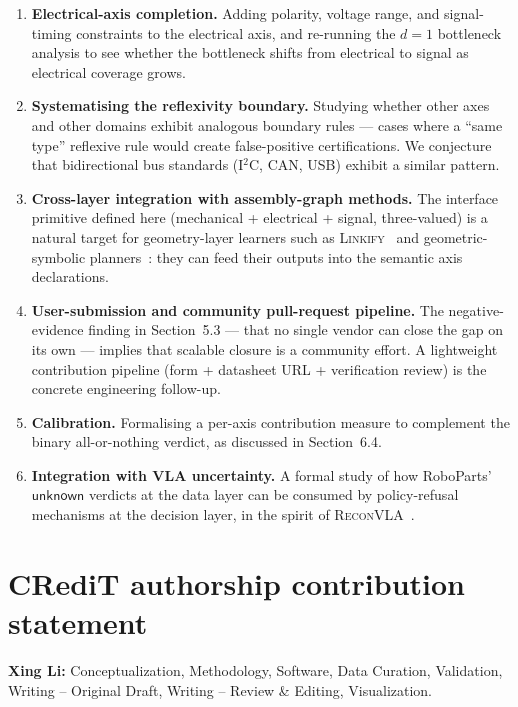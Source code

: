 \documentclass[review]{elsarticle}
\begin{document}
\begin{enumerate}[nosep]
\item \textbf{Electrical-axis completion.} Adding polarity,
voltage range, and signal-timing constraints to the electrical
axis, and re-running the $d=1$ bottleneck analysis to see whether
the bottleneck shifts from electrical to signal as electrical
coverage grows.

\item \textbf{Systematising the reflexivity boundary.} Studying
whether other axes and other domains exhibit analogous boundary
rules — cases where a ``same type'' reflexive rule would create
false-positive certifications. We conjecture that bidirectional
bus standards (I$^2$C, CAN, USB) exhibit a similar pattern.

\item \textbf{Cross-layer integration with assembly-graph methods.}
The interface primitive defined here (mechanical + electrical +
signal, three-valued) is a natural target for geometry-layer
learners such as \textsc{Linkify}~\cite{R1} and geometric-symbolic
planners~\cite{R2}: they can feed their outputs into the semantic
axis declarations.

\item \textbf{User-submission and community pull-request pipeline.}
The negative-evidence finding in Section~5.3 — that no single
vendor can close the gap on its own — implies that scalable closure
is a community effort. A lightweight contribution pipeline (form +
datasheet URL + verification review) is the concrete engineering
follow-up.

\item \textbf{Calibration.} Formalising a per-axis contribution
measure to complement the binary all-or-nothing verdict, as
discussed in Section~6.4.

\item \textbf{Integration with VLA uncertainty.} A formal study of
how RoboParts' $\mathsf{unknown}$ verdicts at the data layer can be
consumed by policy-refusal mechanisms at the decision layer, in the
spirit of \textsc{ReconVLA}~\cite{R10}.
\end{enumerate}

\section*{CRediT authorship contribution statement}
\textbf{Xing Li:} Conceptualization, Methodology, Software,
Data Curation, Validation, Writing -- Original Draft,
Writing -- Review \& Editing, Visualization.
\end{document}
